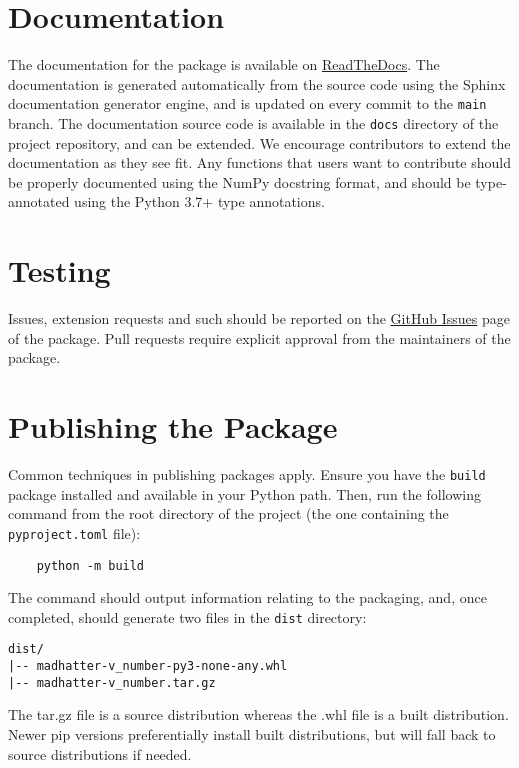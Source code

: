\section{Documentation}

The documentation for the package is available on \href{https://madhatter.readthedocs.io/en/latest/}{ReadTheDocs}. The documentation is generated automatically from the source code using the Sphinx documentation generator engine, and is updated on every commit to the \texttt{main} branch. The documentation source code is available in the \texttt{docs} directory of the project repository, and can be extended. We encourage contributors to extend the documentation as they see fit. Any functions that users want to contribute should be properly documented using the NumPy docstring format, and should be type-annotated using the Python 3.7+ type annotations.

\section{Testing}

Issues, extension requests and such should be reported on the \href{https://github.com/Rinto-kun/madhatter/issues}{GitHub Issues} page of the package. Pull requests require explicit approval from the maintainers of the package. 

\section{Publishing the Package}

Common techniques in publishing packages apply. Ensure you have the \texttt{build} package installed and available in your Python path. Then, run the following command from the root directory of the project (the one containing the \texttt{pyproject.toml} file):
\begin{lstlisting}
    python -m build
\end{lstlisting}


The command should output information relating to the packaging, and, once completed, should generate two files in the \texttt{dist} directory:


\begin{lstlisting}
dist/
|-- madhatter-v_number-py3-none-any.whl
|-- madhatter-v_number.tar.gz
\end{lstlisting}

The tar.gz file is a source distribution whereas the .whl file is a built distribution. Newer pip versions preferentially install built distributions, but will fall back to source distributions if needed. 

